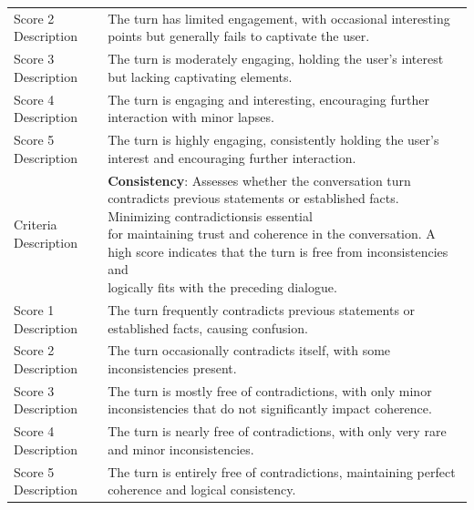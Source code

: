 \begin{tabular}{ll}
Score 2 Description  & The turn has limited engagement, with occasional interesting points but generally fails to captivate the user.                                                                                        \\
Score 3 Description  & The turn is moderately engaging, holding the user's interest but lacking captivating elements.                                                                                 \\
Score 4 Description  & The turn is engaging and interesting, encouraging further interaction with minor lapses.                                                                                                                    \\
Score 5 Description  & The turn is highly engaging, consistently holding the user's interest and encouraging further interaction.                                                                             \\ 
\midrule
Criteria Description & \textbf{Consistency}: \makecell[l]{Assesses whether the conversation turn contradicts previous statements or established facts. Minimizing contradictionsis essential \\ for maintaining trust and coherence in the conversation.  A high score indicates that the turn is free from inconsistencies and \\ logically fits with the preceding dialogue.}                                                                 \\
Score 1 Description  & The turn frequently contradicts previous statements or established facts, causing confusion.                                                                                               \\
Score 2 Description  & The turn occasionally contradicts itself, with some inconsistencies present.                                                               \\
Score 3 Description  & The turn is mostly free of contradictions, with only minor inconsistencies that do not significantly impact coherence.                                                                                                                                    \\
Score 4 Description  & The turn is nearly free of contradictions, with only very rare and minor inconsistencies.                                                                \\
Score 5 Description  & The turn is entirely free of contradictions, maintaining perfect coherence and logical consistency.  \\ 
\bottomrule
\end{tabular}